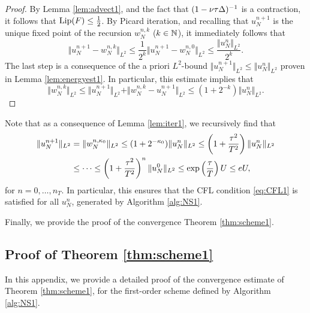 \documentclass[reqno,a4paper]{amsart}
\begin{document}
\begin{proof}
By Lemma \ref{lem:advect1}, and the fact that $(1-\nu {\tau} \Delta)^{-1}$ is a contraction, it follows that $\mathrm{Lip}(F) \le \frac12$. By Picard iteration, and recalling that $u^{n+1}_N$ is the unique fixed point of the recursion $w^{n,k}_N$ ($k\in \mathbb{N}$), it immediately follows that 
\[
\Vert u^{n+1}_N - w^{n,k}_N \Vert_{L^2}
\le
\frac1{2^k} \Vert u^{n+1}_N - w^{n,0}_N \Vert_{L^2}
\le
\frac{\Vert u^n_N \Vert_{L^2}}{2^k}
.
\]
The last step is a consequence of the a priori $L^2$-bound $\Vert u^{n+1}_N \Vert_{L^2}\le \Vert u^n_N \Vert_{L^2}$ proven in Lemma \ref{lem:energyest1}. In particular, this estimate implies that 
\[
\Vert w^{n,k}_N \Vert_{L^2} 
\le  
\Vert u^{n+1}_N \Vert_{L^2} + \Vert w^{n,k}_N - u^{n+1}_N \Vert_{L^2} 
\le
(1+2^{-k}) \Vert u^n_N \Vert_{L^2}.
\]
\end{proof}
\begin{remark} \label{rem:bound1}
Note that as a consequence of Lemma \ref{lem:iter1}, we recursively find that
\begin{align*}
\Vert u^{n+1}_N \Vert_{L^2}
&=
\Vert w^{n,\kappa_0}_N \Vert_{L^2}
\le 
(1+2^{-\kappa_0}) \Vert u^n_N \Vert_{L^2}
\le
\left(1+\frac{{\tau}^2}{T^2}\right) \Vert u^n_N \Vert_{L^2}
\\
&\le
\dots
\le
\left(1+\frac{{\tau}^2}{T^2}\right)^n \Vert u^0_N \Vert_{L^2}
\le
\exp\left(\frac{{\tau}}{T}\right) U
\le
e U,
\end{align*}
for $n=0,\dots, n_T$. In particular, this ensures that the CFL condition \eqref{eq:CFL1} is satisfied for all $u^n_N$, generated by Algorithm \ref{alg:NS1}.
\end{remark}


Finally, we provide the proof of the convergence Theorem \ref{thm:scheme1}. 
\subsection{Proof of Theorem \ref{thm:scheme1}} \label{app:s1pf}
In this appendix, we provide a detailed proof of the convergence estimate of Theorem \ref{thm:scheme1}, for the first-order scheme defined by Algorithm \ref{alg:NS1}. 
\end{document}
